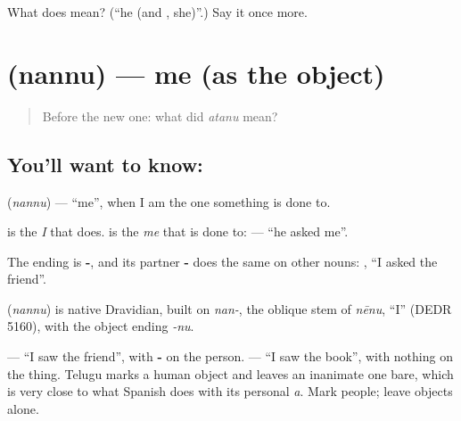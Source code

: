 \begin{tcolorbox}[breakable,colback=teal!4,colframe=teal!35!black,title={Before you move on}]
What does  mean? (\textquotedblleft{}he (and , she)\textquotedblright{}.) Say it once more.
\end{tcolorbox}
\section[\texorpdfstring{\te{నన్ను} (nannu)}{నన్ను (nannu)}]{ (nannu) — me (as the object)}

\label{lesson:TE-C79-me}



\begin{quote}
Before the new one: what did \emph{atanu} mean?
\end{quote}

\subsection*{You'll want to know: }
\textbf{} (\emph{nannu}) — \textquotedblleft{}me\textquotedblright{}, when I am the one something is done to.

 is the \emph{I} that does.  is the \emph{me} that is done to: \textbf{  } — \textquotedblleft{}he asked me\textquotedblright{}.

The ending is \textbf{-}, and its partner \textbf{-} does the same on other nouns:  , \textquotedblleft{}I asked the friend\textquotedblright{}.

\begin{cousinweb}
\textbf{} (\emph{nannu}) is native Dravidian, built on \emph{nan-}, the oblique stem of \emph{nēnu}, \textquotedblleft{}I\textquotedblright{} (DEDR 5160), with the object ending \emph{-nu}.
\end{cousinweb}

\begin{grammarlens}[title={Grammar Lens: people get marked, things usually do not}]
\textbf{ } — \textquotedblleft{}I saw the friend\textquotedblright{}, with \textbf{-} on the person. \textbf{ } — \textquotedblleft{}I saw the book\textquotedblright{}, with nothing on the thing. Telugu marks a human object and leaves an inanimate one bare, which is very close to what Spanish does with its personal \emph{a}. Mark people; leave objects alone.
\end{grammarlens}

